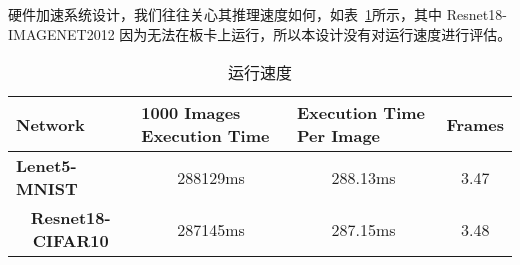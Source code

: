 硬件加速系统设计，我们往往关心其推理速度如何，如表~\ref{tab:Execution Time}所示，其中 Resnet18-IMAGENET2012 因为无法在板卡上运行，所以本设计没有对运行速度进行评估。

\begin{table}[!htbp]
    \caption{运行速度}
    \label{tab:Execution Time}
    \centering
    \footnotesize%
    \setlength{\tabcolsep}{4pt}%
    \renewcommand{\arraystretch}{1.2}%
    \begin{tabular}{lccc}
        \toprule
        \textbf{Network}                              & \multicolumn{1}{l}{\textbf{1000 Images Execution Time}} & \multicolumn{1}{l}{\textbf{Execution Time Per Image}} & \textbf{Frames} \\
        \midrule
        \textbf{Lenet5-MNIST}                         & 288129ms                                                & 288.13ms                                              & 3.47            \\
        \multicolumn{1}{c}{\textbf{Resnet18-CIFAR10}} & 287145ms                                                & 287.15ms                                              & 3.48            \\
        \bottomrule                   
    \end{tabular}
\end{table}

